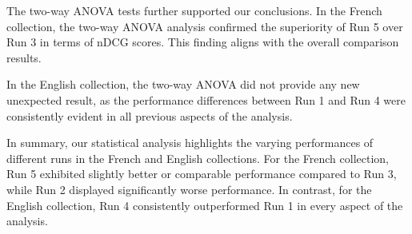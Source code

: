 The two-way \ac{ANOVA} tests further supported our conclusions. 
In the French collection, the two-way \ac{ANOVA} analysis confirmed the superiority of Run 5 over Run 3 in terms of \ac{nDCG} scores. 
This finding aligns with the overall comparison results. 

In the English collection, the two-way \ac{ANOVA} did not provide any new unexpected result, as the performance differences between Run 1 and Run 4 were consistently evident in all previous aspects of the analysis.

In summary, our statistical analysis highlights the varying performances of different runs in the French and English collections. 
For the French collection, Run 5 exhibited slightly better or comparable performance compared to Run 3, while Run 2 displayed significantly worse performance. 
In contrast, for the English collection, Run 4 consistently outperformed Run 1 in every aspect of the analysis.

































